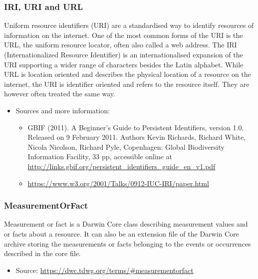 \documentclass[
]{book}
\providecommand{\tightlist}{%
  \setlength{\itemsep}{0pt}\setlength{\parskip}{0pt}}
\begin{document}
\hypertarget{URI}{%
\subsubsection*{IRI, URI and URL}\label{URI}}

Uniform resource identifiers (URI) are a standardised way to identify resources of information on the internet. One of the most common forms of the URI is the URL, the uniform resource locator, often also called a web address. The IRI (Internationalized Resource Identifier) is an internationalised expansion of the URI supporting a wider range of characters besides the Latin alphabet. While URL is location oriented and describes the physical location of a resource on the internet, the URI is identifier oriented and refers to the resource itself. They are however often treated the same way.

\begin{itemize}
\tightlist
\item
  Sources and more information:

  \begin{itemize}
  \tightlist
  \item
    GBIF (2011). A Beginner's Guide to Persistent Identifiers, version 1.0. Released on 9 February 2011. Authors Kevin Richards, Richard White, Nicola Nicolson, Richard Pyle, Copenhagen: Global Biodiversity Information Facility, 33 pp, accessible online at \url{http://links.gbif.org/persistent_identifiers_guide_en_v1.pdf}
  \item
    \url{https://www.w3.org/2001/Talks/0912-IUC-IRI/paper.html}
  \end{itemize}
\end{itemize}

\hypertarget{measurementorfact}{%
\subsubsection*{MeasurementOrFact}\label{measurementorfact}}

Measurement or fact is a Darwin Core class describing measurement values and or facts about a resource. It can also be an extension file of the Darwin Core archive storing the measurements or facts belonging to the events or occurrences described in the core file.

\begin{itemize}
\tightlist
\item
  Source: \url{https://dwc.tdwg.org/terms/\#measurementorfact}
\end{itemize}
\end{document}
